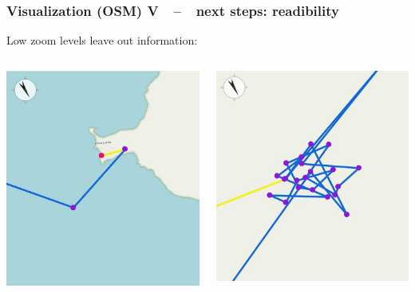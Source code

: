 \documentclass[xcolor=dvipsnames]{beamer}
\begin{document}
\begin{frame}
	\frametitle{\textbf{Visualization (OSM) V}~~--~~next steps: readibility}
	Low zoom levels leave out information:
	\begin{columns}
	\begin{column}{0.5\textwidth}
		\includegraphics[width=1\textwidth]{screenshots/vis-functional-2.jpg}
	\end{column}
	\begin{column}{0.5\textwidth}
		\begin{center}
		\includegraphics[width=1\textwidth]{screenshots/vis-readability-2.jpg}

\end{center}
\end{column}
\end{columns}
\end{frame}
\end{document}
